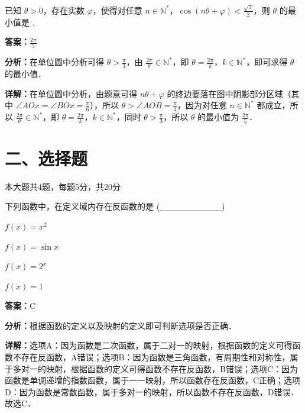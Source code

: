 \begin{question}[points=5]
已知 $\theta>0$，存在实数 $\varphi$，使得对任意 $n\in\mathbb{N}^*$，$\cos(n\theta+\varphi)<\frac{\sqrt{3}}{2}$，则 $\theta$ 的最小值是  .
\fillin[{$\frac{2\pi}{5}$}]
\begin{solution}
\textbf{答案：}$\frac{2\pi}{5}$

\textbf{分析：}在单位圆中分析可得 $\theta>\frac{\pi}{3}$，由 $\frac{2\pi}{\theta}\in\mathbb{N}^*$，即 $\theta=\frac{2\pi}{k}$，$k\in\mathbb{N}^*$，即可求得 $\theta$ 的最小值．

\textbf{详解：}在单位圆中分析，由题意可得 $n\theta+\varphi$ 的终边要落在图中阴影部分区域（其中 $\angle AOx=\angle BOx=\frac{\pi}{6}$），所以 $\theta>\angle AOB=\frac{\pi}{3}$，因为对任意 $n\in\mathbb{N}^*$ 都成立，所以 $\frac{2\pi}{\theta}\in\mathbb{N}^*$，即 $\theta=\frac{2\pi}{k}$，$k\in\mathbb{N}^*$，同时 $\theta>\frac{\pi}{3}$，所以 $\theta$ 的最小值为 $\frac{2\pi}{5}$．
\end{solution}
\end{question}

\section*{二、选择题}
本大题共4题，每题5分，共20分

\begin{question}[points=5]
下列函数中，在定义域内存在反函数的是 (\_\_\_\_\_\_\_\_\_\_)
\begin{choices}
  \item $f(x)=x^2$
  \item $f(x)=\sin x$
  \item $f(x)=2^x$
  \item $f(x)=1$
\end{choices}
\begin{solution}
\textbf{答案：}C

\textbf{分析：}根据函数的定义以及映射的定义即可判断选项是否正确．

\textbf{详解：}选项A：因为函数是二次函数，属于二对一的映射，根据函数的定义可得函数不存在反函数，A错误；选项B：因为函数是三角函数，有周期性和对称性，属于多对一的映射，根据函数的定义可得函数不存在反函数，B错误；选项C：因为函数是单调递增的指数函数，属于一一映射，所以函数存在反函数，C正确；选项D：因为函数是常数函数，属于多对一的映射，所以函数不存在反函数，D错误．故选C．
\end{solution}
\end{question}

